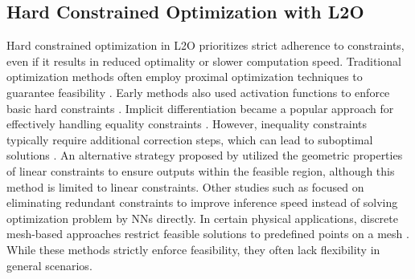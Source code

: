 \subsection{Hard Constrained Optimization with L2O}
Hard constrained optimization in L2O prioritizes strict adherence to constraints, even if it results in reduced optimality or slower computation speed. Traditional optimization methods often employ proximal optimization techniques to guarantee feasibility \cite{cristian2023end,min2024hard}. Early methods also used activation functions to enforce basic hard constraints \cite{sun2018learning}. Implicit differentiation became a popular approach for effectively handling equality constraints \cite{amos2017optnet,donti2021dc3,huang2021deepopf}. However, inequality constraints typically require additional correction steps, which can lead to suboptimal solutions \cite{donti2021dc3}. An alternative strategy proposed by \cite{li2023learning} utilized the geometric properties of linear constraints to ensure outputs within the feasible region, although this method is limited to linear constraints. Other studies such as \cite{misra2022learning,guha2019machine} focused on eliminating redundant constraints to improve inference speed instead of solving optimization problem by NNs directly. In certain physical applications, discrete mesh-based approaches restrict feasible solutions to predefined points on a mesh \cite{amos2017input,zhong2023neural,negiar2022learning}. While these methods strictly enforce feasibility, they often lack  flexibility in general scenarios.